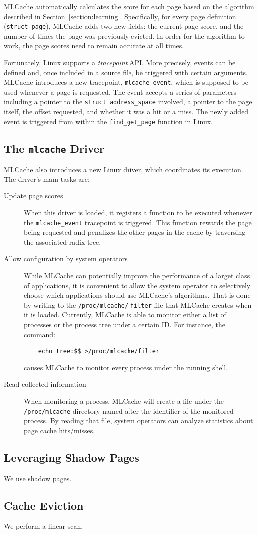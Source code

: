 MLCache automatically calculates the score for each page based on the algorithm
described in Section~\ref{section:learning}. Specifically, for every page definition
(\texttt{struct page}), MLCache adds two new fields: the current page score, and
the number of times the page was previously evicted. In order for the algorithm
to work, the page scores need to remain accurate at all times.

Fortunately, Linux supports a \emph{tracepoint} API. More precisely, events can be
defined and, once included in a source file, be triggered with certain arguments.
MLCache introduces a new tracepoint, \texttt{mlcache\_event}, which is supposed
to be used whenever a page is requested. The event accepts a series of parameters
including a pointer to the \texttt{struct address\_space} involved, a pointer to the
page itself, the offset requested, and whether it was a hit or a miss. The newly
added event is triggered from within the \texttt{find\_get\_page} function in Linux.

\subsection{The \texttt{mlcache} Driver}

MLCache also introduces a new Linux driver, which coordinates its execution. The
driver's main tasks are:

\begin{description}
  \item[Update page scores] When this driver is loaded, it registers a function to be
    executed whenever the \texttt{mlcache\_event} tracepoint is triggered. This function
    rewards the page being requested and penalizes the other pages in the cache by
    traversing the associated radix tree.

  \item[Allow configuration by system operators] While
    MLCache can potentially improve the performance of a larget class of applications,
    it is convenient to allow the system operator to selectively choose which applications
    should use MLCache's algorithms. That is done by writing to the \texttt{/proc/mlcache/}
    \texttt{filter}
    file that MLCache creates when it is loaded. Currently, MLCache is able to monitor either
    a list of processes or the process tree under a certain ID. For instance, the command:
\begin{verbatim}
    echo tree:$$ >/proc/mlcache/filter
\end{verbatim}
    causes MLCache to monitor every process
    under the running shell.

  \item[Read collected information] When monitoring a process, MLCache will create a file
    under the \texttt{/proc/mlcache} directory named after the identifier of the monitored process.
    By reading that file, system operators can analyze statistics about page cache hits/misses.
\end{description}

\subsection{Leveraging Shadow Pages}

We use shadow pages.

\subsection{Cache Eviction}

We perform a linear scan.
